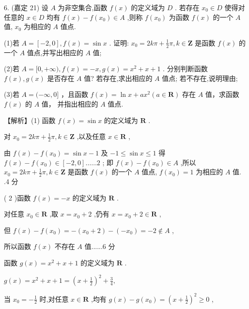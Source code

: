 \documentclass[10pt]{article}
\begin{document}
6. (嘉定 21) 设 \(A\) 为非空集合,函数 \(f\left( x\right)\) 的定义域为 \(D\) . 若存在 \({x}_{0} \in  D\) 使得对任意的 \(x \in  D\) 均有 \(f\left( x\right)  - f\left( {x}_{0}\right)  \in  A\) ,则称 \(f\left( {x}_{0}\right)\) 为函数 \(f\left( x\right)\) 的一个 \(A\) 值, \({x}_{0}\) 为相应的 \(A\) 值点.

(1)若 \(A = \left\lbrack  {-2,0}\right\rbrack  ,f\left( x\right)  = \sin x\) . 证明: \({x}_{0} = {2k\pi } + \frac{1}{2}\pi ,k \in  \mathbf{Z}\) 是函数 \(f\left( x\right)\) 的一个 \(A\) 值点,并写出相应的 \(A\) 值;

(2)若 \(A = \lbrack 0, + \infty ),f\left( x\right)  =  - x,g\left( x\right)  = {x}^{2} + x + 1\) . 分别判断函数 \(f\left( x\right) ,g\left( x\right)\) 是否存在 \(A\) 值? 若存在,求出相应的 \(A\) 值点; 若不存在,说明理由;

(3)若 \(A = ( - \infty ,0\rbrack\) ，且函数 \(f\left( x\right)  = \ln x + a{x}^{2}\left( {a \in  \mathbf{R}}\right)\) 存在 \(A\) 值，求函数 \(f\left( x\right)\) 的 \(A\) 值， 并指出相应的 \(A\) 值点.

【解析】(1) 函数 \(f\left( x\right)  = \sin x\) 的定义域为 \(\mathbf{R}\) .

对 \({x}_{0} = {2k\pi } + \frac{1}{2}\pi ,k \in  \mathbf{Z}\) ,以及任意 \(x \in  \mathbf{R}\) ,

由 \(f\left( x\right)  - f\left( {x}_{0}\right)  = \sin x - 1\) 及 \(- 1 \leq  \sin x \leq  1\) 得 \(f\left( x\right)  - f\left( {x}_{0}\right)  \in  \left\lbrack  {-2,0}\right\rbrack  \ldots \ldots 2\) ; 即 \(f\left( x\right)  - f\left( {x}_{0}\right)  \in  A\) ,所以 \({x}_{0} = {2k\pi } + \frac{1}{2}\pi ,k \in  \mathbf{Z}\) 是函数 \(f\left( x\right)\) 的一个 \(A\) 值点, \(f\left( {x}_{0}\right)  = 1\) 为相应的 \(A\) 值. .4 分

( 2 )函数 \(f\left( x\right)  =  - x\) 的定义域为 \(\mathbf{R}\) .

对任意 \({x}_{0} \in  \mathbf{R}\) ,取 \(x = {x}_{0} + 2\) ,仍有 \(x = {x}_{0} + 2 \in  \mathbf{R}\) ,

但 \(f\left( x\right)  - f\left( {x}_{0}\right)  =  - \left( {{x}_{0} + 2}\right)  - \left( {-{x}_{0}}\right)  =  - 2 \notin  A\) ,

所以函数 \(f\left( x\right)\) 不存在 \(A\) 值......6 分

函数 \(g\left( x\right)  = {x}^{2} + x + 1\) 的定义域为 \(\mathbf{R}\) .

\(g\left( x\right)  = {x}^{2} + x + 1 = {\left( x + \frac{1}{2}\right) }^{2} + \frac{3}{4},\)

当 \({x}_{0} =  - \frac{1}{2}\) 时,对任意 \(x \in  \mathbf{R}\) ,均有 \(g\left( x\right)  - g\left( {x}_{0}\right)  = {\left( x + \frac{1}{2}\right) }^{2} \geq  0\) ,
\end{document}
